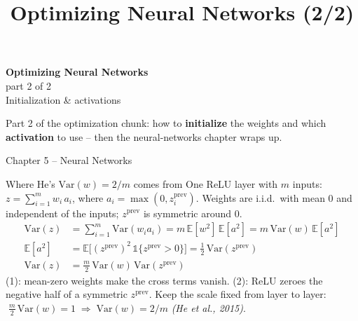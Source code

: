 \documentclass[aspectratio=43]{beamer}
\title{Optimizing Neural Networks (2/2)}
\date{}
\begin{document}
\begin{frame}[plain]
  \vfill
  \begin{center}
    {\Large\color{popblue}\textbf{Optimizing Neural Networks}}\\[0.3em]
    {\normalsize\color{gray} part 2 of 2}\\[0.4em]
    {\large Initialization \& activations}\\[1.0em]
    \begin{minipage}{0.86\textwidth}\centering\small
      Part 2 of the optimization chunk: how to \textbf{initialize} the weights and which
      \textbf{activation} to use -- then the neural-networks chapter wraps up.
    \end{minipage}
  \end{center}
  \vfill
  {\footnotesize\color{gray} Chapter 5 -- Neural Networks}
\end{frame}



\begin{frame}{Where He's $\mathrm{Var}(w) = 2/m$ comes from}
  \small
  One ReLU layer with $m$ inputs: $z = \sum_{i=1}^{m} w_i\,a_i$, where
  $a_i = \max(0, z^{\text{prev}}_i)$. Weights are i.i.d.\ with mean $0$ and independent of the
  inputs; $z^{\text{prev}}$ is symmetric around $0$.
  \begin{align*}
    \mathrm{Var}(z) &= \textstyle\sum_{i=1}^{m} \mathrm{Var}(w_i a_i)
      = m\,\mathbb{E}[w^2]\,\mathbb{E}[a^2] = m\,\mathrm{Var}(w)\,\mathbb{E}[a^2] \tag*{(1)} \\
    \mathbb{E}[a^2] &= \mathbb{E}\big[(z^{\text{prev}})^2\,
      \mathds{1}\{z^{\text{prev}} > 0\}\big] = \tfrac12\,\mathrm{Var}(z^{\text{prev}}) \tag*{(2)} \\
    \mathrm{Var}(z) &= \tfrac{m}{2}\,\mathrm{Var}(w)\,\mathrm{Var}(z^{\text{prev}}) \tag*{(3)}
  \end{align*}
  {\footnotesize (1): mean-zero weights make the cross terms vanish. (2): ReLU zeroes the
  negative half of a symmetric $z^{\text{prev}}$.}
  \vskip 3pt
  Keep the scale fixed from layer to layer: $\;\tfrac{m}{2}\,\mathrm{Var}(w) = 1
  \;\Rightarrow\; \boxed{\mathrm{Var}(w) = 2/m}$ \emph{(He et al., 2015)}.
  \vfill
\end{frame}
\end{document}
